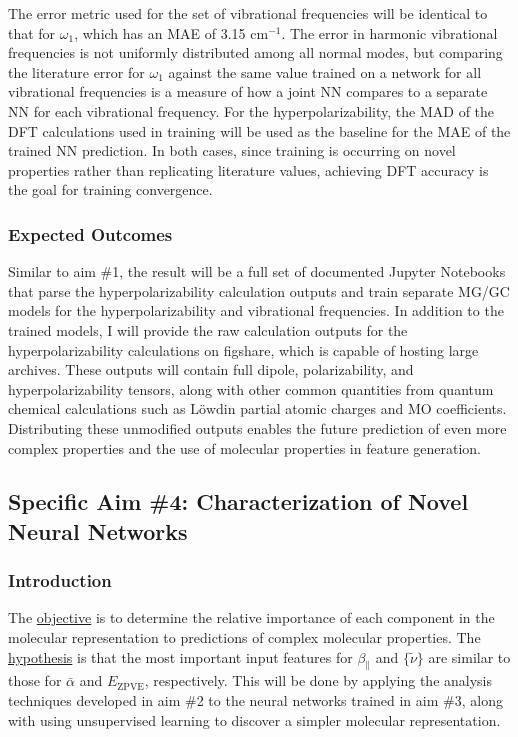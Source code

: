 \documentclass[12pt]{article}
\begin{document}
The error metric used for the set of vibrational frequencies will be identical to that for \(\omega_1\), which has an MAE of 3.15 cm\(^{-1}\). The error in harmonic vibrational frequencies is not uniformly distributed among all normal modes\fxnote{[REF]}, but comparing the literature error for \(\omega_1\) against the same value trained on a network for all vibrational frequencies is a measure of how a joint NN compares to a separate NN for each vibrational frequency. For the hyperpolarizability, the MAD of the DFT calculations used in training will be used as the baseline for the MAE of the trained NN prediction. In both cases, since training is occurring on novel properties rather than replicating literature values, achieving DFT accuracy is the goal for training convergence.

\subsubsection{Expected Outcomes}
\label{sec:orgc342452}

Similar to aim \#1, the result will be a full set of documented Jupyter Notebooks that parse the hyperpolarizability calculation outputs and train separate MG/GC models for the hyperpolarizability and vibrational frequencies. In addition to the trained models, I will provide the raw calculation outputs for the hyperpolarizability calculations on figshare\cite{figshare}, which is capable of hosting large archives. These outputs will contain full dipole, polarizability, and hyperpolarizability tensors, along with other common quantities from quantum chemical calculations such as \(\text{L\"owdin}\) partial atomic charges and MO coefficients. Distributing these unmodified outputs enables the future prediction of even more complex properties and the use of molecular properties in feature generation.

\subsection{Specific Aim \#4: Characterization of Novel Neural Networks}
\label{sec:org39d7df3}

\subsubsection{Introduction}
\label{sec:org8ad6a78}

The \uline{objective} is to determine the relative importance of each component in the molecular representation to predictions of complex molecular properties. The \uline{hypothesis} is that the most important input features for \(\beta_{\parallel}\) and \(\{\tilde{\nu}\}\) are similar to those for \(\bar{\alpha}\) and \(E_{\text{ZPVE}}\), respectively. This will be done by applying the analysis techniques developed in aim \#2 to the neural networks trained in aim \#3, along with using unsupervised learning to discover a simpler molecular representation.
\end{document}

